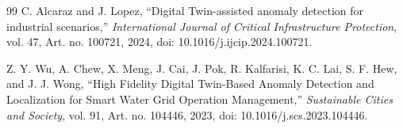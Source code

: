 \documentclass[journal]{IEEEtran}
\begin{document}
\begin{thebibliography}{99}
C. Alcaraz and J. Lopez, ``Digital Twin-assisted anomaly detection for industrial scenarios,'' \emph{International Journal of Critical Infrastructure Protection}, vol. 47, Art. no. 100721, 2024, doi: 10.1016/j.ijcip.2024.100721.

Z. Y. Wu, A. Chew, X. Meng, J. Cai, J. Pok, R. Kalfarisi, K. C. Lai, S. F. Hew, and J. J. Wong, ``High Fidelity Digital Twin-Based Anomaly Detection and Localization for Smart Water Grid Operation Management,'' \emph{Sustainable Cities and Society}, vol. 91, Art. no. 104446, 2023, doi: 10.1016/j.scs.2023.104446.

\end{thebibliography}
\end{document}
